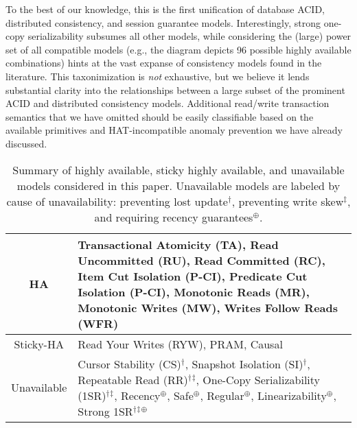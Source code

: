 To the best of our knowledge, this is the first unification of
database ACID, distributed consistency, and session guarantee
models. Interestingly, strong one-copy serializability subsumes all
other models, while considering the (large) power set of all
compatible models (e.g., the diagram depicts 96 possible highly
available combinations) hints at the vast expanse of consistency
models found in the literature. This taxonimization is \textit{not}
exhaustive, but we believe it lends substantial clarity into the
relationships between a large subset of the prominent ACID and
distributed consistency models. Additional read/write transaction
semantics that we have omitted should be easily classifiable based on
the available primitives and HAT-incompatible anomaly prevention we
have already discussed.

 \newcommand{\lostupdate}{$^\dagger$}
 \newcommand{\rwskew}{$^\ddagger$}
 \newcommand{\linearizable}{$^\oplus$}

\begin{table}[t!]
\begin{tabular}{| c | p{6cm} | }\hline
HA & Transactional Atomicity (TA), Read Uncommitted (RU), Read
Committed (RC), Item Cut Isolation (P-CI), Predicate Cut Isolation
(P-CI), Monotonic Reads (MR), Monotonic Writes (MW), Writes Follow
Reads (WFR)\\\hline Sticky-HA & Read Your Writes (RYW), PRAM,
Causal\\\hline Unavailable & Cursor Stability (CS)\lostupdate,
Snapshot Isolation (SI)\lostupdate, Repeatable Read
(RR)\lostupdate\rwskew, One-Copy Serializability
(1SR)\lostupdate\rwskew, Recency\linearizable, Safe\linearizable,
Regular\linearizable, Linearizability\linearizable, Strong
1SR\lostupdate\rwskew\linearizable \\\hline
\end{tabular}
\caption{Summary of highly available, sticky highly available, and
  unavailable models considered in this paper. Unavailable models are
  labeled by cause of unavailability: preventing lost
  update\lostupdate, preventing write skew\rwskew, and requiring
  recency guarantees\linearizable.}
\label{table:hatcompared}
\end{table}

